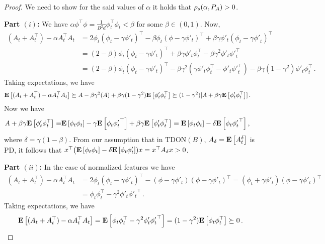 \thtdadmis*
\begin{proof}
We need to show for the said values of $\alpha$ it holds that $\rho_s(\alpha,P_A)>0$. %

\textbf{Part $(i)$:}  We have $\alpha\phi^\top\phi=\frac{1}{B^2d}\phi^\top_t\phi_t<\beta$ for some $\beta\in (0,1)$. Now, 
\begin{align*}
(A_t+A_t^\top) -\alpha A_t^\top A_t 
& = 2\phi_t(\phi_t-\gamma\phi'_t)^\top -\beta\phi_t(\phi-\gamma\phi'_t)^\top+\beta\gamma\phi'_t(\phi_t-\gamma{\phi'}_t)^\top\\
&= (2-\beta)\phi_t(\phi_t-\gamma\phi'_t)^\top +\beta\gamma\phi'_t\phi^\top_t-\beta\gamma^2\phi'_t{\phi'}_t^\top \\
&= (2-\beta)\phi_t(\phi_t-\gamma\phi'_t)^\top -\beta\gamma^2(\gamma\phi'_t\phi^\top_t- \phi'_t{\phi'}_t^\top)-\beta\gamma(1-\gamma^2)\phi'_t\phi_t^\top\,.
\end{align*}
Taking expectations, we have 
\begin{align*}
\mathbf{E}\left[ (A_t+A_t^\top)-\alpha A_t^\top A_t\right] &\succeq  A -\beta\gamma^2(A)+\beta\gamma(1-\gamma^2)\mathbf{E}\left[\phi'_t\phi_t^\top\right]
\succeq (1-\gamma^2)[A +\beta\gamma\mathbf{E}\left[\phi'_t\phi_t^\top\right]]\,.
\end{align*}
Now we have 
\begin{align*}
A +\beta\gamma\mathbf{E}\left[\phi'_t\phi_t^\top\right]=& \mathbf{E}\left[\phi_t\phi_t\right]-\gamma\mathbf{E}\left[\phi_t{\phi'_t}^\top\right] +\beta\gamma\mathbf{E}\left[\phi'_t\phi_t^\top\right]
=\mathbf{E}\left[\phi_t\phi_t\right]-\delta\mathbf{E}\left[\phi_t{\phi'_t}^\top\right],
\end{align*}
where $\delta=\gamma(1-\beta)$. 
From our assumption that in $\text{TDON}(B)$, $A_{\delta}=\mathbf{E}\left[A_t^\delta\right]$ is PD,
it follows that $x^\top\big(\mathbf{E}\left[\phi_t\phi_t\right]-\delta\mathbf{E}\left[\phi_t\phi'_t\right] )x=x^\top A_{\delta} x>0$.

\textbf{Part $(ii)$:}
In the case of normalized features we have
\begin{align*}
(A_t+A_t^\top) -\alpha A_t^\top A_t 
&= 2\phi_t(\phi_t-\gamma\phi'_t)^\top - (\phi-\gamma\phi'_t)(\phi-\gamma\phi'_t)^\top
=(\phi_t+\gamma\phi'_t)(\phi-\gamma\phi'_t)^\top\\
&=\phi_t\phi_t^\top-\gamma^2\phi'_t{\phi'_t}^\top\,.
\end{align*}
Taking expectations, we have
\begin{align*}
\mathbf{E}\left[(A_t+A_t^\top) -\alpha A_t^\top A_t \right]=\mathbf{E}\left[\phi_t\phi_t^\top-\gamma^2\phi'_t{\phi'_t}^\top\right]
=(1-\gamma^2)\mathbf{E}\left[\phi_t\phi_t^\top\right]
\succeq 0\,.
\end{align*}


\end{proof}
